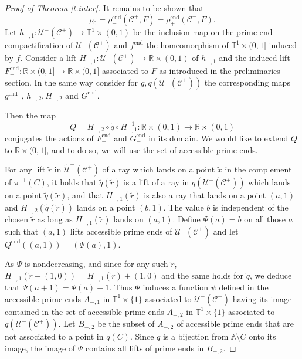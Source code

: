 \documentclass[12pt,a4paper]{amsart}
\theoremstyle{definition}
\theoremstyle{remark}
\newcommand{\T}{\mathbb{T}}
\newcommand{\R}{\mathbb{R}}
\newcommand{\A}{\mathbb{A}}
\begin{document}
\begin{proof}[Proof of Theorem \ref{t.inter}]
It remains to be shown that 
$$\rho_0= \rho^{\mathrm{end}}_-(\mathcal{C}^+,F)=\rho^{\mathrm{end}}_+(\mathcal{C}^-,F).$$
Let $h_{-,1}:\mathcal{U}^{-}(\mathcal{C}^{+})\to \T^1\times(0,1)$ be the inclusion map on the prime-end compactification of $\mathcal{U}^{-}(\mathcal{C}^{+})$ and $f^{\mathrm{end}}_{-}$ the homeomorphism of $\T^1\times(0,1]$ induced by $f$. 
Consider a lift $H_{-,1}:\mathcal{U}^-(\mathcal{C}^+)\to \R\times(0,1)$ of $h_{-,1}$ and the induced lift 
$F^{\mathrm{end}}_{-}:\R\times(0,1]\to\R\times(0,1]$ associated to $F$ as introduced in the preliminaries section.
In the same way consider for $g,q(\mathcal{U}^-(\mathcal{C}^+))$ the corresponding maps $g^{\mathrm{end}_-}$, $h_{-,2}, H_{-,2}$ and $G^{\mathrm{end}}_{-}$.

Then the map 
$$Q=H_{-,2}\circ \widetilde q \circ H_{-,1}^{-1}:\R\times (0,1)\to \R\times (0,1)$$
 conjugates the actions of $F^{\mathrm{end}}_-$ and $G^{\mathrm{end}}_-$ in its domain. 
 We would like to extend $Q$ to $\R\times(0,1]$, and to do so, we will use the set of accessible prime ends.


For any lift $\tilde{r}$ in $\tilde{\mathcal{U}}^{-}(\mathcal{C}^{+})$ of a ray which lands on a point $\tilde{x}$ in the complement
of $\pi^{-1}(C)$, it holds that $\tilde{q}(\tilde{r})$ is a lift of a ray in  
$q(\mathcal{U}^{-}(\mathcal{C}^{+}))$ which lands on a point $\tilde{q}(\tilde{x})$, and that $H_{-,1}(\tilde{r})$ is also a ray that lands on a point $(a,1)$ and $H_{-,2}(\tilde{q}(\tilde{r}))$ lands on a point $(b,1)$. The value $b$ is independent of the chosen $\tilde{r}$ as long as $H_{-,1}(\tilde{r})$ lands on $(a,1)$.  Define $\Psi(a)=b$ on all those $a$ such that $(a,1)$ lifts accessible prime ends of $\mathcal{U}^-(\mathcal{C}^+)$
and let $Q^{\mathrm{end}}((a,1))=(\Psi(a),1)$.

As $\Psi$ is nondecreasing, and since for any such $\tilde{r}$, $H_{-,1}(\tilde{r}+(1,0))=H_{-,1}(\tilde{r})+(1,0)$ and the same holds for $\tilde{q}$, we deduce that $\Psi(a+1)=\Psi(a)+1$.  Thus
$\Psi$ induces a function $\psi$ defined in the accessible prime ends $A_{-,1}$ in $\T^1\times\{1\}$ associated to
$\mathcal{U}^{-}(\mathcal{C}^{+})$ having its image contained in the set of accessible prime ends
$A_{-,2}$ in $\T^1\times\{1\}$ associated to $q\left(\mathcal{U}^{-}(\mathcal{C}^{+})\right)$.
Let  $B_{-,2}$ be the subset of $A_{-,2}$ of accessible prime ends that are not associated to a point in $q(C)$. Since $q$ is a bijection from $\A\setminus C$ onto its image, the image of $\Psi$ contains all lifts of prime ends in $B_{-,2}$.


\end{proof}
\end{document}
